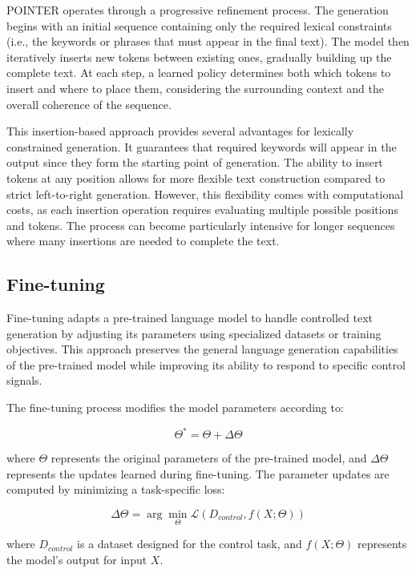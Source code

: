 POINTER operates through a progressive refinement process. 
The generation begins with an initial sequence containing only the required lexical constraints (i.e., the keywords or phrases that must appear in the final text). The model then iteratively inserts new tokens between existing ones, gradually building up the complete text. At each step, a learned policy determines both which tokens to insert and where to place them, considering the surrounding context and the overall coherence of the sequence.

This insertion-based approach provides several advantages for lexically constrained generation. It guarantees that required keywords will appear in the output since they form the starting point of generation. The ability to insert tokens at any position allows for more flexible text construction compared to strict left-to-right generation. However, this flexibility comes with computational costs, as each insertion operation requires evaluating multiple possible positions and tokens. The process can become particularly intensive for longer sequences where many insertions are needed to complete the text.

\subsection{Fine-tuning}

Fine-tuning adapts a pre-trained language model to handle controlled text generation by adjusting its parameters using specialized datasets or training objectives. 
This approach preserves the general language generation capabilities of the pre-trained model while improving its ability to respond to specific control signals.

The fine-tuning process modifies the model parameters according to:

\begin{equation}
    \Theta^* = \Theta + \Delta\Theta
\end{equation}

where $\Theta$ represents the original parameters of the pre-trained model, and $\Delta\Theta$ represents the updates learned during fine-tuning. The parameter updates are computed by minimizing a task-specific loss:

\begin{equation}
    \Delta\Theta = \arg\min_{\Theta} \mathcal{L}(D_{control}, f(X; \Theta))
\end{equation}

where $D_{control}$ is a dataset designed for the control task, and $f(X; \Theta)$ represents the model's output for input $X$.

